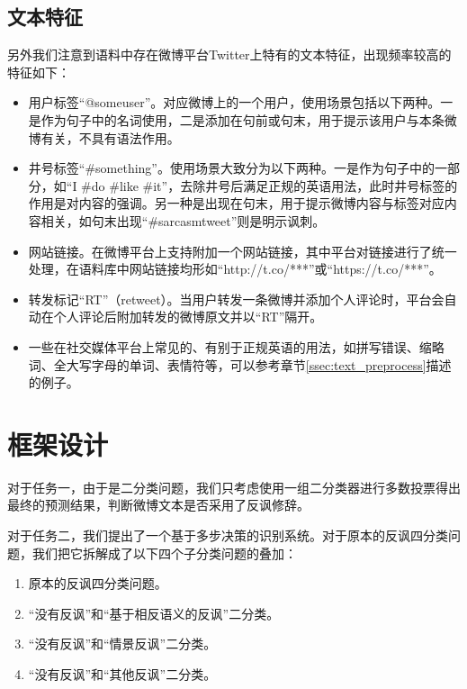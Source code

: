 \subsection{文本特征}
\label{ssec:exp_irony_det_data_text}

另外我们注意到语料中存在微博平台Twitter上特有的文本特征，出现频率较高的特征如下：

\begin{itemize}

\item 用户标签“@someuser”。对应微博上的一个用户，使用场景包括以下两种。一是作为句子中的名词使用，二是添加在句前或句末，用于提示该用户与本条微博有关，不具有语法作用。

\item 井号标签“\#something”。使用场景大致分为以下两种。一是作为句子中的一部分，如“I \#do \#like \#it”，去除井号后满足正规的英语用法，此时井号标签的作用是对内容的强调。另一种是出现在句末，用于提示微博内容与标签对应内容相关，如句末出现“\#sarcasmtweet”则是明示讽刺。

\item 网站链接。在微博平台上支持附加一个网站链接，其中平台对链接进行了统一处理，在语料库中网站链接均形如“http://t.co/***”或“https://t.co/***”。

\item 转发标记“RT”（retweet）。当用户转发一条微博并添加个人评论时，平台会自动在个人评论后附加转发的微博原文并以“RT”隔开。

\item 一些在社交媒体平台上常见的、有别于正规英语的用法，如拼写错误、缩略词、全大写字母的单词、表情符等，可以参考章节\ref{ssec:text_preprocess}描述的例子。

\end{itemize}


\section{框架设计}
\label{sec:exp_irony_det_framework}

对于任务一，由于是二分类问题，我们只考虑使用一组二分类器进行多数投票得出最终的预测结果，判断微博文本是否采用了反讽修辞。

对于任务二，我们提出了一个基于多步决策的识别系统。对于原本的反讽四分类问题，我们把它拆解成了以下四个子分类问题的叠加：

\begin{enumerate}

\item 原本的反讽四分类问题。
\item “没有反讽”和“基于相反语义的反讽”二分类。
\item “没有反讽”和“情景反讽”二分类。
\item “没有反讽”和“其他反讽”二分类。

\end{enumerate}

